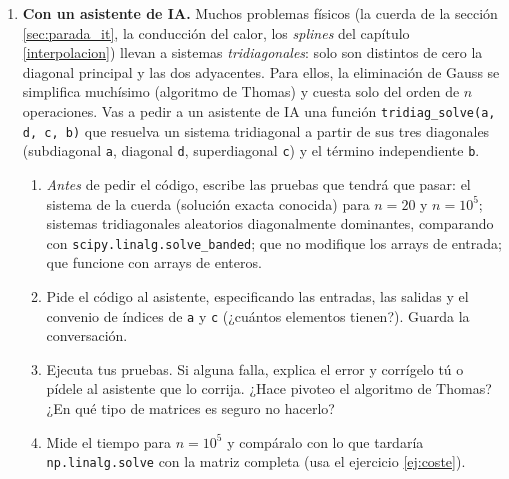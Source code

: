 \begin{enumerate}
\item \label{ej:thomas_ia} \textbf{Con un asistente de IA.} Muchos problemas físicos (la cuerda de la sección \ref{sec:parada_it}, la conducción del calor, los \emph{splines} del capítulo \ref{interpolacion}) llevan a sistemas \emph{tridiagonales}: solo son distintos de cero la diagonal principal y las dos adyacentes. Para ellos, la eliminación de Gauss se simplifica muchísimo (algoritmo de Thomas) y cuesta solo del orden de $n$ operaciones. Vas a pedir a un asistente de IA una función \texttt{tridiag\_solve(a, d, c, b)} que resuelva un sistema tridiagonal a partir de sus tres diagonales (subdiagonal \texttt{a}, diagonal \texttt{d}, superdiagonal \texttt{c}) y el término independiente \texttt{b}.
\begin{enumerate}
\item \emph{Antes} de pedir el código, escribe las pruebas que tendrá que pasar: el sistema de la cuerda (solución exacta conocida) para $n=20$ y $n=10^5$; sistemas tridiagonales aleatorios diagonalmente dominantes, comparando con \texttt{scipy.linalg.solve\_banded}; que no modifique los arrays de entrada; que funcione con arrays de enteros.
\item Pide el código al asistente, especificando las entradas, las salidas y el convenio de índices de \texttt{a} y \texttt{c} (¿cuántos elementos tienen?). Guarda la conversación.
\item Ejecuta tus pruebas. Si alguna falla, explica el error y corrígelo tú o pídele al asistente que lo corrija. ¿Hace pivoteo el algoritmo de Thomas? ¿En qué tipo de matrices es seguro no hacerlo?
\item Mide el tiempo para $n=10^5$ y compáralo con lo que tardaría \texttt{np.linalg.solve} con la matriz completa (usa el ejercicio \ref{ej:coste}).
\end{enumerate}
\end{enumerate}

